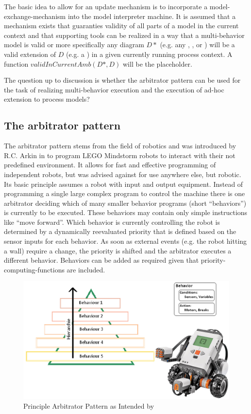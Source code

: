 The basic idea to allow for an update mechanism is to incorporate a model-exchange-mechanism into the model interpreter machine. It is assumed that a mechanism exists that guaranties validity of all parts of a model in the current context and that supporting tools can be realized in a way that a multi-behavior model is valid or more specifically any diagram $D*$ (e.g. any , , or ) will be a valid extension of $D$ (e.g. a ) in a given currently running process context. A function $validInCurrentAmb(D*,D)$ will be the placeholder. 

The question up to discussion is whether the arbitrator pattern can be used for the task of realizing multi-behavior execution and the execution of ad-hoc extension to process models?

\subsection{The arbitrator pattern}

The arbitrator pattern stems from the field of robotics and was introduced by R.C. Arkin in \cite{arkin98behavior} to program LEGO Mindstorm robots to interact with their not predefined environment. It allows for fast and effective programming of independent robots, but was advised against for use anywhere else, but robotic.
Its basic principle assumes a robot with input and output equipment. Instead of programming a single large complex program to control the machine there is one arbitrator deciding which of many smaller behavior programs (short “behaviors”) is currently to be executed. These behaviors may contain only simple instructions like “move forward”. Which behavior is currently controlling the robot is determined by a dynamically reevaluated priority that is defined based on the sensor inputs for each behavior. As soon as external events (e.g. the robot hitting a wall) require a change, the priority is shifted and the arbitrator executes a different behavior. Behaviors can be added as required given that priority-computing-functions are included. 

\begin{figure}[htbp]
	\centering
	\includegraphics[width=0.8\linewidth]{Figures/Chapter5/ArbitratorPattern/ArbitratorPrinciple.png}
	\caption[Principle Arbitrator Pattern as Intended by \cite{arkin98behavior}]{Principle Arbitrator Pattern as Intended by \cite{arkin98behavior}}
	\label{fig:arbitratorPattern}
\end{figure}

